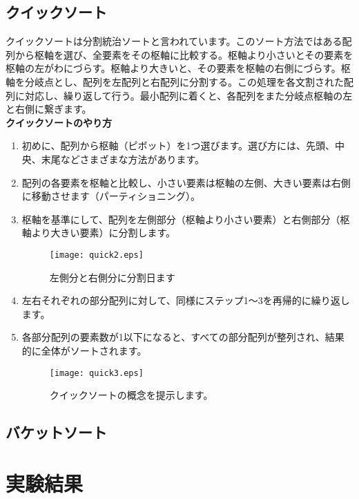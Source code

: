 \documentclass[a4j]{jarticle}
\begin{document}
\subsection{クイックソート}
クイックソートは分割統治ソートと言われています。このソート方法ではある配列から枢軸を選び、全要素をその枢軸に比較する。枢軸より小さいとその要素を枢軸の左がわにづらす。枢軸より大きいと、その要素を枢軸の右側にづらす。枢軸を分岐点とし、配列を左配列と右配列に分割する。この処理を各文割された配列に対応し、繰り返して行う。最小配列に着くと、各配列をまた分岐点枢軸の左と右側に繋ぎます。\\
\textbf{クイックソートのやり方}
\begin{enumerate}
  \item 初めに、配列から枢軸（ピボット）を1つ選びます。選び方には、先頭、中央、末尾などさまざまな方法があります。
  \item 配列の各要素を枢軸と比較し、小さい要素は枢軸の左側、大きい要素は右側に移動させます（パーティショニング）。
  \item 枢軸を基準にして、配列を左側部分（枢軸より小さい要素）と右側部分（枢軸より大きい要素）に分割します。
  \begin{figure}[H]
    \centering
    \texttt{[image: quick2.eps]}
    \caption{左側分と右側分に分割日ます}
  \end{figure}
  \newpage
  \item 左右それぞれの部分配列に対して、同様にステップ1～3を再帰的に繰り返します。
  \item 各部分配列の要素数が1以下になると、すべての部分配列が整列され、結果的に全体がソートされます。
  \begin{figure}[H]
    \centering
    \texttt{[image: quick3.eps]}
    \caption{クイックソートの概念を提示します。}
  \end{figure}
\end{enumerate}
\subsection{バケットソート}
\section{実験結果}
\end{document}
